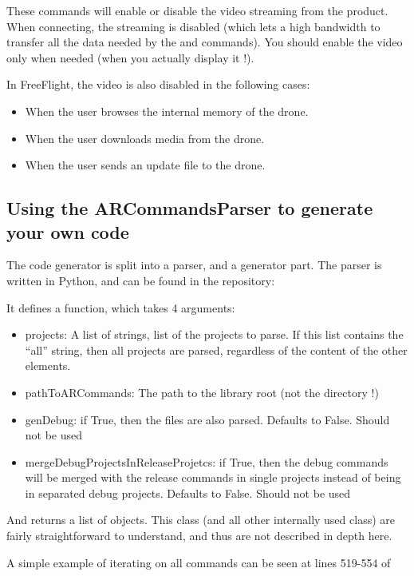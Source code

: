 These commands will enable or disable the video streaming from the product. When connecting, the streaming is disabled (which lets a high bandwidth to transfer all the data needed by the  and  commands). You should enable the video only when needed (when you actually display it !).

In FreeFlight, the video is also disabled in the following cases:
\begin{itemize}
\item{When the user browses the internal memory of the drone.}
\item{When the user downloads media from the drone.}
\item{When the user sends an update file to the drone.}
\end{itemize}


\subsection{Using the ARCommandsParser to generate your own code}

The code generator is split into a parser, and a generator part. The parser is written in Python, and can be found in the  repository:

It defines a  function, which takes 4 arguments:
\begin{itemize}
\item{projects: A list of strings, list of the projects to parse. If this list contains the ``all'' string, then all projects are parsed, regardless of the content of the other elements.}
\item{pathToARCommands: The path to the  library root (not the  directory !)}
\item{genDebug: if True, then the  files are also parsed. Defaults to False. Should not be used}
\item{mergeDebugProjectsInReleaseProjetcs: if True, then the debug commands will be merged with the release commands in single projects instead of being in separated debug projects. Defaults to False. Should not be used}
\end{itemize}

And returns a list of  objects. This class (and all other internally used class) are fairly straightforward to understand, and thus are not described in depth here.

A simple example of iterating on all commands can be seen at lines 519-554 of 


